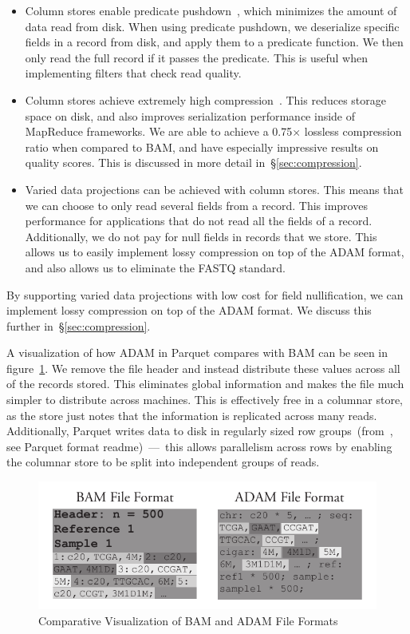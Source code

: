 \documentclass[10pt,twocolumn]{article}
\theoremstyle{plain}
\begin{document}
\begin{itemize}
\item Column stores enable predicate pushdown~\cite{lamb12}, which minimizes the amount of data read from disk. When
using predicate pushdown, we deserialize specific fields in a record from disk, and apply them to a predicate function. We
then only read the full record if it passes the predicate. This is useful when implementing filters that check read quality.
\item Column stores achieve extremely high compression~\cite{abadi06}. This reduces storage space on disk, and also improves
serialization performance inside of MapReduce frameworks. We are able to achieve a 0.75$\times$ lossless compression
ratio when compared to BAM, and have especially impressive results on quality scores. This is discussed in more
detail in~\S\ref{sec:compression}.
\item Varied data projections can be achieved with column stores. This means that we can choose to only read several
fields from a record. This improves performance for applications that do not read all the fields of a record. Additionally,
we do not pay for null fields in records that we store. This allows us to easily implement lossy compression on top of the
ADAM format, and also allows us to eliminate the FASTQ standard.
\end{itemize}

By supporting varied data projections with low cost for field nullification, we can implement lossy compression on top
of the ADAM format. We discuss this further in~\S\ref{sec:compression}.

A visualization of how ADAM in Parquet compares with BAM can be seen in figure~\ref{fig:file-format}. We remove the file header
and instead distribute these values across all of the records stored. This eliminates global information and makes the file much
simpler to distribute across machines. This is effectively free in a columnar store, as the store just notes that the information is
replicated across many reads. Additionally, Parquet writes data to disk in regularly sized row groups~(from~\cite{parquet}, see
Parquet format readme)~---~this allows parallelism across rows by enabling the columnar store to be split into independent
groups of reads.

\begin{figure}[h]
\begin{center}
\includegraphics[width=\linewidth]{file-format.pdf}
\end{center}
\caption{Comparative Visualization of BAM and ADAM File Formats}
\label{fig:file-format}
\end{figure}
\end{document}
